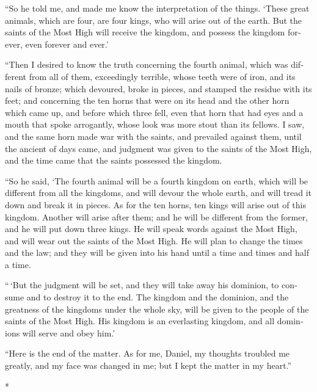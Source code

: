 \begin{paracol}{2}
\begin{otherlanguage}{english}
``So he told me, and made me know the interpretation of the things.
 `These great animals, which are four, are four kings,
who will arise out of the earth.  But the saints of the
Most High will receive the kingdom, and possess the kingdom forever,
even forever and ever.'

 ``Then I desired to know the truth concerning the fourth
animal, which was different from all of them, exceedingly terrible,
whose teeth were of iron, and its nails of bronze; which devoured, broke
in pieces, and stamped the residue with its feet;  and
concerning the ten horns that were on its head and the other horn which
came up, and before which three fell, even that horn that had eyes and a
mouth that spoke arrogantly, whose look was more stout than its fellows.
 I saw, and the same horn made war with the saints, and
prevailed against them,  until the ancient of days came,
and judgment was given to the saints of the Most High, and the time came
that the saints possessed the kingdom.

 ``So he said, `The fourth animal will be a fourth
kingdom on earth, which will be different from all the kingdoms, and
will devour the whole earth, and will tread it down and break it in
pieces.  As for the ten horns, ten kings will arise out
of this kingdom. Another will arise after them; and he will be different
from the former, and he will put down three kings.  He
will speak words against the Most High, and will wear out the saints of
the Most High. He will plan to change the times and the law; and they
will be given into his hand until a time and times and half a time.

 ``\,`But the judgment will be set, and they will take
away his dominion, to consume and to destroy it to the end.
 The kingdom and the dominion, and the greatness of the
kingdoms under the whole sky, will be given to the people of the saints
of the Most High. His kingdom is an everlasting kingdom, and all
dominions will serve and obey him.'

 ``Here is the end of the matter. As for me, Daniel, my
thoughts troubled me greatly, and my face was changed in me; but I kept
the matter in my heart.''

\end{otherlanguage}

\switchcolumn[0]*

\hypertarget{escena-de-la-cara-del-sueuxf1o-lucha-del-carnero-de-cuernos-desiguales-persa-y-el-macho-cabruxedo-de-un-cuerno-griego-victoria-y-fortalecimiento-de-este-uxfaltimo}{%
}
\end{paracol}
